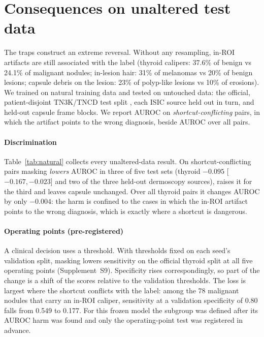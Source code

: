 \section{Consequences on unaltered test data}\label{sec:natural}\label{sec:robust}
The traps construct an extreme reversal. Without any resampling, in-ROI artifacts are still associated with the label
(thyroid calipers: 37.6\% of benign vs 24.1\% of malignant nodules; in-lesion hair: 31\% of melanomas vs 20\% of benign
lesions; capsule debris on the lesion: 23\% of polyp-like lesions vs 10\% of erosions). We trained on natural training
data and tested on untouched data: the official, patient-disjoint TN3K/TNCD test split \citep{gong2022acl}, each ISIC
source held out in turn, and held-out capsule frame blocks. We report AUROC on \emph{shortcut-conflicting} pairs, in
which the artifact points to the wrong diagnosis, beside AUROC over all pairs.


\paragraph{Discrimination} Table~\ref{tab:natural} collects every unaltered-data result. On shortcut-conflicting pairs
masking \emph{lowers} AUROC in three of five test sets (thyroid $-0.095$ [$-0.167, -0.023$] and two of the three
held-out dermoscopy sources), raises it for the third and leaves capsule unchanged. Over all thyroid pairs it changes
AUROC by only $-0.004$: the harm is confined to the cases in which the in-ROI artifact points to the wrong diagnosis,
which is exactly where a shortcut is dangerous.

\paragraph{Operating points (pre-registered)} A clinical decision uses a threshold. With thresholds fixed on each
seed's validation split, masking lowers sensitivity on the official thyroid split at all five operating points
(Supplement~S9). Specificity rises correspondingly, so part of the change is a shift of the scores relative to the
validation thresholds. The loss is largest where the shortcut conflicts with the label: among the 78 malignant
nodules that carry an in-ROI caliper, sensitivity at a validation specificity of 0.80 falls from 0.549 to 0.177. For
this frozen model the subgroup was defined after its AUROC harm was found and only the operating-point test was
registered in advance.

